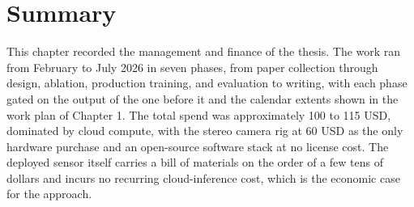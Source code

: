 \FloatBarrier
\section{Summary}
This chapter recorded the management and finance of the thesis. The work
ran from February to July 2026 in seven phases, from paper collection
through design, ablation, production training, and evaluation to
writing, with each phase gated on the output of the one before it and
the calendar extents shown in the work plan of Chapter 1. The total
spend was approximately 100 to 115 USD, dominated by cloud compute, with
the stereo camera rig at 60 USD as the only hardware purchase and an
open-source software stack at no license cost. The deployed sensor
itself carries a bill of materials on the order of a few tens of dollars
and incurs no recurring cloud-inference cost, which is the economic case
for the approach.
